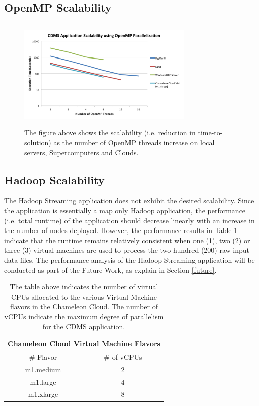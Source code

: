 \documentclass[9pt,twocolumn,twoside]{../../styles/osajnl}
\begin{document}
\subsection{OpenMP Scalability} \label{omp-scalability}
\begin{figure}
\centering
\includegraphics[height=2.1in, width=3.3in]{images/scalability2}
\caption{The figure above shows the scalability (i.e. reduction in
  time-to-solution) as the number of OpenMP threads increase on local
  servers, Supercomputers and Clouds.}
\label{fig:scalability2}
\end{figure}

\subsection{Hadoop Scalability} \label{hadoop-scalability}
The Hadoop Streaming application does not exhibit the desired
scalability. Since the application is essentially a map only Hadoop
application, the performance (i.e. total runtime) of the application
should decrease linearly with an increase in the number of nodes
deployed. However, the performance results in Table \ref{tab:hadoop}
indicate that the runtime remains relatively consistent when one (1),
two (2) or three (3) virtual machines are used to process the two
hundred (200) raw input data files. The performance analysis of the
Hadoop Streaming application will be conducted as part of the Future
Work, as explain in Section \ref{future}.

\begin{table}[htbp]
\centering
\begin{tabular}{cc}
\multicolumn{2}{c}{\bf Chameleon Cloud Virtual Machine Flavors}\\
\hline
\# Flavor & \# of vCPUs \\
\hline
m1.medium & 2 \\
m1.large & 4 \\
m1.xlarge & 8 \\
\hline
\end{tabular}
\caption{The table above indicates the number of virtual CPUs
  allocated to the various Virtual Machine flavors in the Chameleon
  Cloud. The number of vCPUs indicate the maximum degree of
  parallelism for the CDMS application.}
\label{tab:hadoop}
\end{table}
\end{document}
